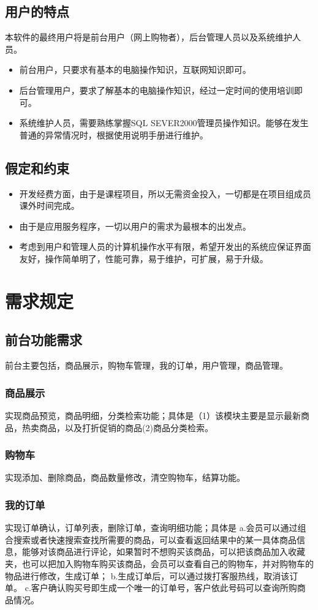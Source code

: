 \documentclass[UTF8, a4paper]{ctexrep}
\begin{document}
	\section{用户的特点}
	本软件的最终用户将是前台用户（网上购物者），后台管理人员以及系统维护人员。
	\begin{itemize}
		\item 前台用户，只要求有基本的电脑操作知识，互联网知识即可。
		\item 后台管理用户，要求了解基本的电脑操作知识，经过一定时间的使用培训即可。
		\item 系统维护人员，需要熟练掌握SQL SEVER2000管理员操作知识。能够在发生普通的异常情况时，根据使用说明手册进行维护。
	\end{itemize}
	\section{假定和约束}
	\begin{itemize}
		\item 开发经费方面，由于是课程项目，所以无需资金投入，一切都是在项目组成员课外时间完成。
		\item 由于是应用服务程序，一切以用户的需求为最根本的出发点。
		\item 考虑到用户和管理人员的计算机操作水平有限，希望开发出的系统应保证界面友好，操作简单明了，性能可靠，易于维护，可扩展，易于升级。
	\end{itemize}

	\chapter{需求规定}
	\section{前台功能需求}
	前台主要包括，商品展示，购物车管理，我的订单，用户管理，商品管理。
	\subsection{商品展示}
	实现商品预览，商品明细，分类检索功能；具体是（1）该模块主要是显示最新商品，热卖商品，以及打折促销的商品(2)商品分类检索。
	\subsection{购物车}
	实现添加、删除商品，商品数量修改，清空购物车，结算功能。
	\subsection{我的订单}
	实现订单确认，订单列表，删除订单，查询明细功能；具体是
	a.会员可以通过组合搜索或者快速搜索查找所需要的商品，可以查看返回结果中的某一具体商品信息，能够对该商品进行评论，如果暂时不想购买该商品，可以把该商品加入收藏夹，也可以把加入购物车购买该商品，会员可以查看自己的购物车，并对购物车的物品进行修改，生成订单；
	b.生成订单后，可以通过拨打客服热线，取消该订单。
	c.客户确认购买号即生成一个唯一的订单号，客户依此号码可以查询所购商品情况。
\end{document}

